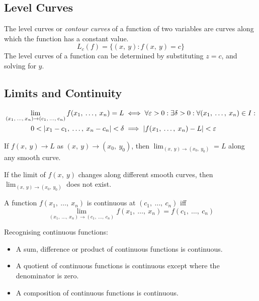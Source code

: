 \documentclass{article}
\begin{document}
\subsection{Level Curves}
\begin{definition}
    The level curves or \textit{contour curves} of a function of two variables are
    curves along which the function has a constant value.
    \begin{equation*}
        L_c\left( f \right) = \bigl\{ \left( x,\: y \right) : f\left(x,\: y\right) = c\bigr\}
    \end{equation*}
    The level curves of a function can be determined by substituting \(z=c\), and
    solving for \(y\).
\end{definition}
\subsection{Limits and Continuity}
\begin{definition}
    \begin{align*}
        \lim_{(x_1,\: \ldots,\: x_n)\to (c_1,\: \ldots,\: c_n)} f(x_1,\: \ldots,\: x_n) = L
                                                    & \iff\forall\varepsilon>0: \exists\delta>0: \forall (x_1,\: \ldots,\: x_n) \in I: \\
        0<\abs{x_1-c_1,\: \ldots,\: x_n-c_n}<\delta & \implies \abs{f(x_1,\: \ldots,\: x_n)-L}<\varepsilon
    \end{align*}
\end{definition}
\begin{theorem}
    If \(f(x,\: y) \to L\) as \((x,\: y) \to (x_0,\: y_0)\), then
    \(\displaystyle \lim_{(x,\: y) \to (x_0,\: y_0)} = L\) along any smooth
    curve.
\end{theorem}
\begin{theorem}
    If the limit of \(f(x,\: y)\) changes along different smooth curves, then
    \(\displaystyle \lim_{(x,\: y) \to (x_0,\: y_0)}\) does not exist.
\end{theorem}
\begin{theorem}
    A function \(f(x_1,\: \ldots,\: x_n)\) is continuous at
    \((c_1,\: \ldots,\: c_n)\) iff
    \begin{equation*}
        \lim_{(x_1,\: \ldots,\: x_n)\to (c_1,\: \ldots,\: c_n)} f(x_1,\: \ldots,\: x_n) = f(c_1,\: \ldots,\: c_n)
    \end{equation*}
\end{theorem}
Recognising continuous functions:
\begin{itemize}
    \item A sum, difference or product of continuous functions is continuous.
    \item A quotient of continuous functions is continuous except where the
          denominator is zero.
    \item A composition of continuous functions is continuous.
\end{itemize}
\end{document}
